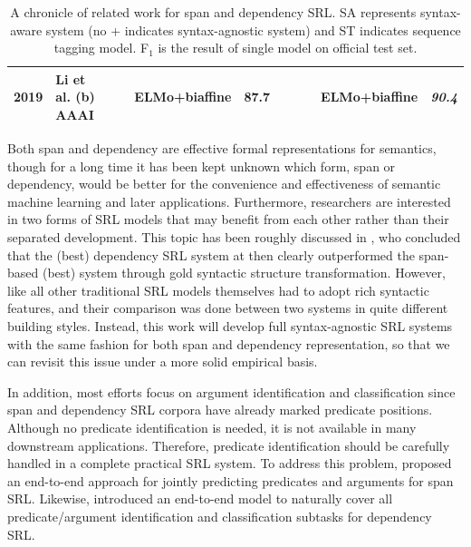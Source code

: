 \documentclass[letterpaper]{article} %
\begin{document}
\begin{table}[!htp]
\begin{tabular}{llcclc|llcclc}
		\hline
		\textbf{2019} & \multicolumn{1}{l}{Li et al. (b) AAAI} &
		\multicolumn{1}{c}{} & \multicolumn{1}{c}{} & \multicolumn{1}{l}{ELMo+biaffine} & \multicolumn{1}{c}{\textbf{87.7}} & \multicolumn{2}{l}{} & \multicolumn{1}{c}{} & \multicolumn{1}{c}{} & \multicolumn{1}{l}{ELMo+biaffine} & \multicolumn{1}{c}{\textit{\textbf{90.4}}}\\
		\hline
		
		\hline
	\end{tabular}
	\caption{A chronicle of related work for span and dependency SRL. SA represents syntax-aware system (no + indicates syntax-agnostic system) and ST indicates sequence tagging model. F$_1$ is the result of single model on official test set.}
	\label{tab:related work}
\end{table}

Both span and dependency are effective formal representations for semantics, though for a long time it has been kept unknown which form, span or dependency, would be better for the convenience and effectiveness of semantic machine learning and later applications. Furthermore, researchers are interested in two forms of SRL models that may benefit from each other rather than their separated development. This topic has been roughly discussed in \cite{johansson2008EMNLP}, who concluded that the (best) dependency SRL system at then clearly outperformed the span-based (best) system through gold syntactic structure transformation. However, \citeauthor{johansson2008EMNLP}  like all other traditional SRL models themselves had to adopt rich syntactic features, and their comparison was done between two systems in quite different building styles.
Instead, this work will develop full syntax-agnostic SRL systems with the same fashion for both span and dependency representation, so that we can revisit this issue under a more solid empirical basis.



In addition, most efforts focus on argument identification and classification since span and dependency SRL corpora have already marked predicate positions. Although no predicate identification is needed, it is not available in many downstream applications. Therefore, predicate identification should be carefully handled in a complete practical SRL system. To address this problem, \citeauthor{he2018jointly}  proposed an end-to-end approach for jointly predicting predicates and arguments for span SRL. Likewise, \citeauthor{cai2018full}  introduced an end-to-end model to naturally cover all predicate/argument identification and classification subtasks for dependency SRL.
\end{document}
